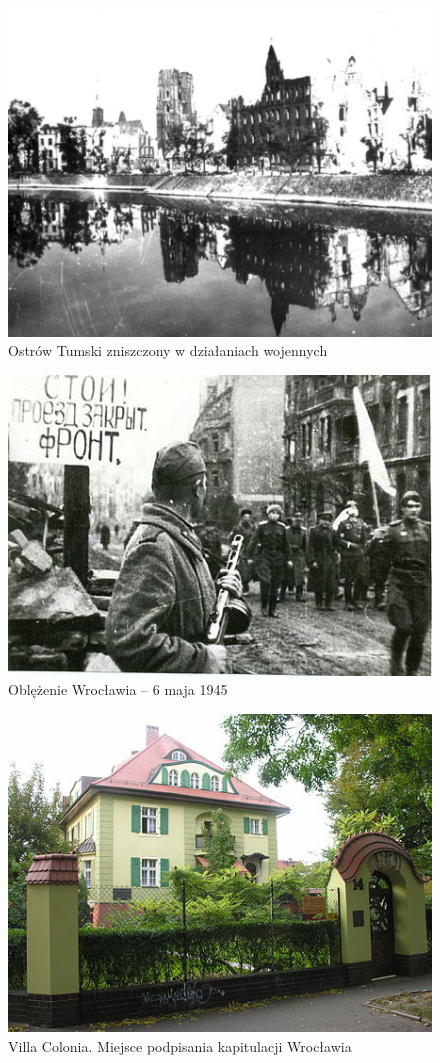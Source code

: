 \documentclass{article}
\begin{document}
\begin{figure}[h!]
\centering
\includegraphics[scale=0.6]{450px-Zniszczony_Grunwald.png}
\caption{Ostrów Tumski zniszczony w działaniach wojennych}
\label{fig:ostrtumski}
\end{figure}

\begin{figure}[h!]
\centering
\includegraphics[scale=1.5]{450px-FestungBreslau6V1945.jpg}
\caption{Oblężenie Wrocławia – 6 maja 1945}
\label{fig:oblez}
\end{figure}

\begin{figure}[h!]
\centering
\includegraphics[scale=2]{450px-Willa_Colonia-Wroclaw.jpg}
\caption{Villa Colonia. Miejsce podpisania kapitulacji Wrocławia}
\label{fig:villa colonia}
\end{figure}
\newpage
\end{document}
